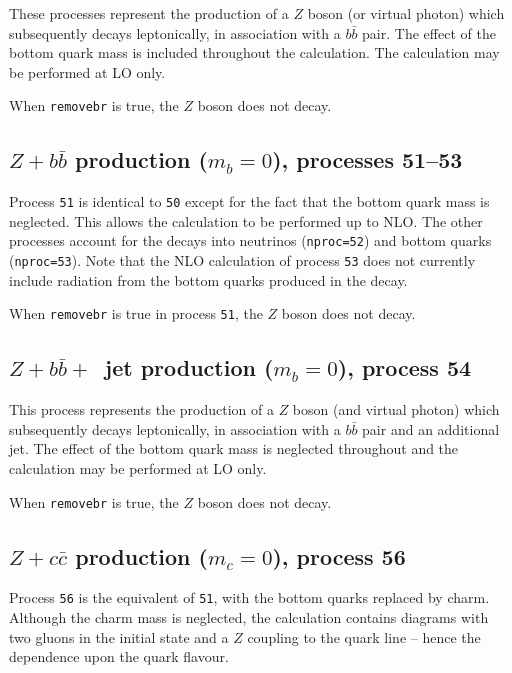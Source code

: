 \documentclass[12pt]{article}
\begin{document}
These processes represent the production of a $Z$ boson (or virtual photon)
which subsequently decays leptonically, in association
with a $b{\bar b}$ pair. The effect of
the bottom quark mass is included throughout the calculation.  
The calculation may be performed at LO only.

When {\tt removebr} is true, the $Z$ boson does not decay.

\subsection{$Z+b{\bar b}$ production ($m_b=0$), processes 51--53}
\label{subsec:zbbmassless}

Process {\tt 51} is identical to {\tt 50} except for the fact
that the bottom quark mass is neglected. This allows the calculation to be
performed up to NLO. The other processes account for the decays into
neutrinos ({\tt nproc=52}) and bottom quarks ({\tt nproc=53}). Note that
the NLO calculation of process {\tt 53} does not currently 
include radiation from the
bottom quarks produced in the decay.

When {\tt removebr} is true in process {\tt 51}, the $Z$ boson does not decay.

\subsection{$Z+b{\bar b}+$~jet production ($m_b=0$), process 54}
\label{subsec:zbbjetmassless}

This process represents the production of a $Z$ boson (and virtual photon)
which subsequently decays leptonically, in association
with a $b{\bar b}$ pair and an additional jet.
The effect of the bottom quark mass is neglected throughout
and the calculation may be performed at LO only.

When {\tt removebr} is true, the $Z$ boson does not decay.

\subsection{$Z+c{\bar c}$ production ($m_c=0$), process 56}
\label{subsec:zccmassless}

Process {\tt 56} is the equivalent of {\tt 51}, with the bottom quarks
replaced by charm. Although the charm mass is neglected, the calculation
contains diagrams with two gluons in the initial state and a
$Z$ coupling to the quark line -- hence the dependence upon the quark
flavour.
\end{document}
